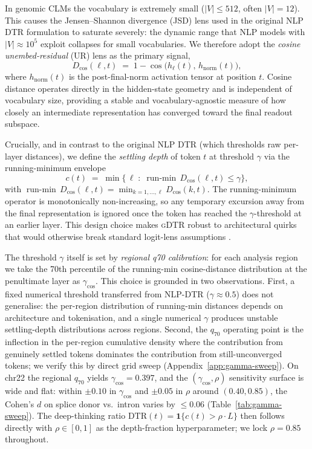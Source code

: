 \documentclass{article}
\theoremstyle{plain}
\theoremstyle{definition}
\theoremstyle{remark}
\newcommand{\gDTR}{\textsc{gDTR}}
\newcommand{\DTR}{\textsc{DTR}}
\newcommand{\hl}{h_{\ell}}
\newcommand{\hnorm}{h_{\mathrm{norm}}}
\newcommand{\Dcos}{D_{\cos}}
\newcommand{\runmin}{\operatorname{run\text{-}min}}
\begin{document}
In genomic CLMs the vocabulary is extremely small
($|V|\le 512$, often $|V|=12$). This causes the
Jensen--Shannon divergence (JSD) lens used in the original NLP
\DTR{} formulation to saturate severely: the dynamic range that NLP
models with $|V|\approx 10^5$ exploit collapses for small vocabularies.
We therefore adopt the \emph{cosine unembed-residual} (UR) lens as the
primary signal,
\begin{equation}
  \Dcos(\ell, t) \;=\; 1 - \cos\!\bigl(\hl(t),\, \hnorm(t)\bigr),
  \label{eq:cos-lens}
\end{equation}
where $\hnorm(t)$ is the post-final-norm activation tensor at position
$t$. Cosine distance operates directly in the hidden-state geometry and
is independent of vocabulary size, providing a stable and
vocabulary-agnostic measure of how closely an intermediate
representation has converged toward the final readout subspace.

Crucially, and in contrast to the original NLP \DTR{} (which thresholds
raw per-layer distances), we define the \emph{settling depth} of token
$t$ at threshold $\gamma$ via the running-minimum envelope
\begin{equation}
  c(t) \;=\; \min\bigl\{\, \ell \;:\; \runmin\,\Dcos(\ell, t) \le \gamma\bigr\},
  \label{eq:settling}
\end{equation}
with $\runmin\,\Dcos(\ell, t) = \min_{k=1,\dots,\ell}\Dcos(k, t)$. The
running-minimum operator is monotonically non-increasing, so any
temporary excursion away from the final representation is ignored once
the token has reached the $\gamma$-threshold at an earlier layer. This
design choice makes \gDTR{} robust to architectural quirks that would
otherwise break standard logit-lens assumptions
\cite{nostalgebraist2020logitlens,belrose2023tunedlens}.

The threshold $\gamma$ itself is set by \emph{regional q70 calibration}:
for each analysis region we take the 70th percentile of the running-min
cosine-distance distribution at the penultimate layer as $\gamma_{\cos}$.
This choice is grounded in two observations. First, a fixed numerical
threshold transferred from NLP-\DTR{} ($\gamma\approx 0.5$) does not
generalise: the per-region distribution of running-min distances
depends on architecture and tokenisation, and a single numerical
$\gamma$ produces unstable settling-depth distributions across regions.
Second, the $q_{70}$ operating point is the inflection in the
per-region cumulative density where the contribution from genuinely
settled tokens dominates the contribution from still-unconverged tokens;
we verify this by direct grid sweep (Appendix~\ref{app:gamma-sweep}). On
chr22 the regional $q_{70}$ yields $\gamma_{\cos}=0.397$, and the
$(\gamma_{\cos}, \rho)$ sensitivity surface is wide and flat: within
$\pm 0.10$ in $\gamma_{\cos}$ and $\pm 0.05$ in $\rho$ around
$(0.40, 0.85)$, the Cohen's $d$ on splice donor vs.\ intron varies by
$\le 0.06$ (Table~\ref{tab:gamma-sweep}). The deep-thinking ratio
$\mathrm{DTR}(t) = \mathbf{1}\{c(t) > \rho \cdot L\}$ then follows
directly with $\rho \in [0,1]$ as the depth-fraction hyperparameter; we
lock $\rho = 0.85$ throughout.
\end{document}
